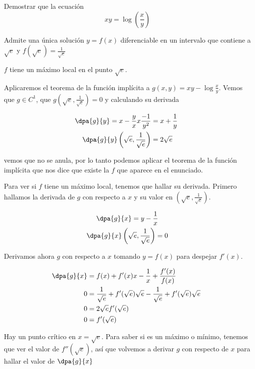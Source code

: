 \begin{problem}[24] Demostrar que la ecuación
\[xy = \log \left(\frac{x}{y}\right)\]

\ppart Admite una única solución $y=f(x)$ diferenciable en un intervalo que contiene a $\sqrt{e}$ y $f(\sqrt{e}) = \frac{1}{\sqrt{e}}$

\ppart $f$ tiene un máximo local en el punto $\sqrt{e}$.

\solution

\spart
Aplicaremos el teorema de la función implícita a $g(x,y)=xy - \log \frac{x}{y}$. Vemos que $g∈C^1$, que $g\left(\sqrt{e}, \frac{1}{\sqrt{e}}\right) = 0$ y calculando su derivada

\begin{gather*}
 \dpa{g}{y} = x - \frac{y}{x} x \frac{-1}{y^2} = x + \frac{1}{y} \\
 \dpa{g}{y}\left(\sqrt{e}, \frac{1}{\sqrt{e}}\right)  = 2 \sqrt{e} 
 \end{gather*}
 
 vemos que no se anula, por lo tanto podemos aplicar el teorema de la función implícita que nos dice que existe la $f$ que aparece en el enunciado.
 
\spart Para ver si $f$ tiene un máximo local, tenemos que hallar su derivada. Primero hallamos la derivada de $g$ con respecto a $x$ y su valor en $\left(\sqrt{e}, \frac{1}{\sqrt{e}}\right)$. 

\begin{gather*}
 \dpa{g}{x} = y - \frac{1}{x} \\
 \dpa{g}{x}\left(\sqrt{e}, \frac{1}{\sqrt{e}}\right)  = 0
 \end{gather*}

Derivamos ahora $g$ con respecto a $x$ tomando $y=f(x)$ para despejar $f'(x)$.

\begin{align*}
\dpa{g}{x} &= f(x) +  f'(x)x - \frac{1}{x} + \frac{f'(x)}{f(x)} \\
0 &= \frac{1}{\sqrt{e}} + f'(\sqrt{e}) \sqrt{e} - \frac{1}{\sqrt{e}} + f'(\sqrt{e})\sqrt{e} \\
0 &= 2\sqrt{e}f'(\sqrt{e}) \\
0 &= f'(\sqrt{e})
\end{align*}

Hay un punto crítico en $x = \sqrt{e}$. Para saber si es un máximo o mínimo, tenemos que ver el valor de $f''(\sqrt{e})$, así que volvemos a derivar $g$ con respecto de $x$ para hallar el valor de $\dpa{g}{x}$


\end{problem}
